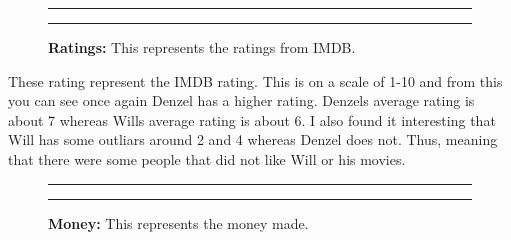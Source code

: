 \documentclass[]{article}
\begin{document}
\newpage

\begin{figure}[!ht]
    \hrule
    \begin{center}
    \end{center}
    \label{fig:oneimage-1}
    \caption{ \textbf{Ratings:} This represents the ratings from IMDB.}
    \hrule
\end{figure}

These rating represent the IMDB rating. This is on a scale of 1-10 and
from this you can see once again Denzel has a higher rating. Denzels
average rating is about 7 whereas Wills average rating is about 6. I
also found it interesting that Will has some outliars around 2 and 4
whereas Denzel does not. Thus, meaning that there were some people that
did not like Will or his movies.

\begin{figure}[!ht]
    \hrule
    \begin{center}
    \end{center}
    \label{fig:oneimage-1}
    \caption{ \textbf{Money:} This represents the money made.}
    \hrule
\end{figure}
\end{document}
